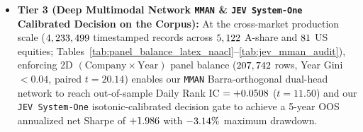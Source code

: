 \begin{itemize}[leftmargin=*,nosep,topsep=2pt]
    \item \textbf{Tier 3 (Deep Multimodal Network \texttt{MMAN} \& \texttt{JEV System-One} Calibrated Decision on the \CorpusTotalShort{} Corpus):} At the cross-market production scale ($4,233,499$ timestamped records across $5,122$ A-share and $81$ US equities; Tables~\ref{tab:panel_balance_latex_naacl}--\ref{tab:jev_mman_audit}), enforcing 2D $(\text{Company} \times \text{Year})$ panel balance ($207,742$ rows, Year Gini $<0.04$, paired $t=20.14$) enables our \texttt{MMAN} Barra-orthogonal dual-head network to reach out-of-sample Daily Rank IC $= +0.0508$ ($t=11.50$) and our \texttt{JEV System-One} isotonic-calibrated decision gate to achieve a 5-year OOS annualized net Sharpe of $+1.986$ with $-3.14\%$ maximum drawdown.
\end{itemize}

